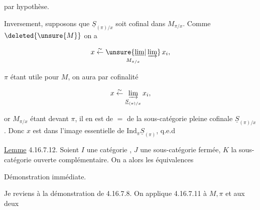

par hypothèse.

Inversement, supposons que $\underline S_{(\pi)/x}$ soit cofinal dans $M_{\pi/x}$. Comme $\deleted{\unsure{M}}$ on a

\[x\overset{\sim}{\leftarrow}\underset{M_{\pi/x}}{\unsure{\underline{\lim}|\varinjlim}}\,x_i,\]

$\pi$ étant utile pour $M$, on aura  par cofinalité

\[x\overset{\sim}{\leftarrow}\underset{\underline S_{(\pi)/x}}{\varinjlim}\,x_i,\]

or $M_{\pi/x}$ étant  devant $\pi$, il en est de $=$ de la sous-catégorie  pleine cofinale $\underline S_{(\pi)/x}$. Donc $x$ est dans l'image essentielle de $\mathrm{Ind}_\pi\underline S_{(\pi)}$, q.e.d

\uline{Lemme} 4.16.7.12. Soient $I$ une catégorie , $J$ une sous-catégorie fermée, $K$ la sous-catégorie ouverte complémentaire. On a alors les équivalences


Démonstration immédiate.

Je reviens à la démonstration de 4.16.7.8. On applique    4.16.7.11  à $M,\pi$ et aux deux

